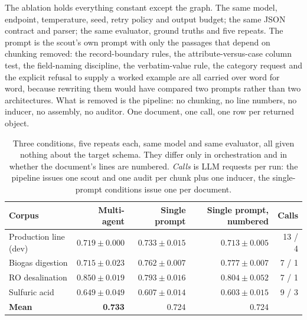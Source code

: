 \documentclass[11pt]{article}
\begin{document}
The ablation holds everything constant except the graph. The same model,
endpoint, temperature, seed, retry policy and output budget; the same JSON
contract and parser; the same evaluator, ground truths and five repeats. The
prompt is the scout's own prompt with only the passages that depend on chunking
removed: the record-boundary rules, the attribute-versus-case column test, the
field-naming discipline, the verbatim-value rule, the category request and the
explicit refusal to supply a worked example are all carried over word for word,
because rewriting them would have compared two prompts rather than two
architectures. What is removed is the pipeline: no chunking, no line numbers,
no inducer, no assembly, no auditor. One document, one call, one row per
returned object.

\begin{table}[H]
\centering
\caption{Three conditions, five repeats each, same model and same evaluator, all
given nothing about the target schema. They differ only in orchestration and in
whether the document's lines are numbered. \emph{Calls} is LLM requests per run:
the pipeline issues one scout and one audit per chunk plus one inducer, the
single-prompt conditions issue one per document.}
\label{tab:ablation}
\small
\begin{tabular}{lrrrr}
\toprule
\textbf{Corpus} & \textbf{Multi-agent} & \textbf{Single prompt} &
\textbf{Single prompt, numbered} & \textbf{Calls} \\
\midrule
Production line (dev) & $0.719 \pm 0.000$ & $\mathbf{0.733 \pm 0.015}$ & $0.713 \pm 0.005$ & 13 / 4 \\
Biogas digestion      & $0.715 \pm 0.023$ & $0.762 \pm 0.007$ & $\mathbf{0.777 \pm 0.007}$ & 7 / 1 \\
RO desalination       & $\mathbf{0.850 \pm 0.019}$ & $0.793 \pm 0.016$ & $0.804 \pm 0.052$ & 7 / 1 \\
Sulfuric acid         & $\mathbf{0.649 \pm 0.049}$ & $0.607 \pm 0.014$ & $0.603 \pm 0.015$ & 9 / 3 \\
\midrule
\textbf{Mean}         & \textbf{0.733} & 0.724 & 0.724 & \\
\bottomrule
\end{tabular}
\end{table}
\end{document}
